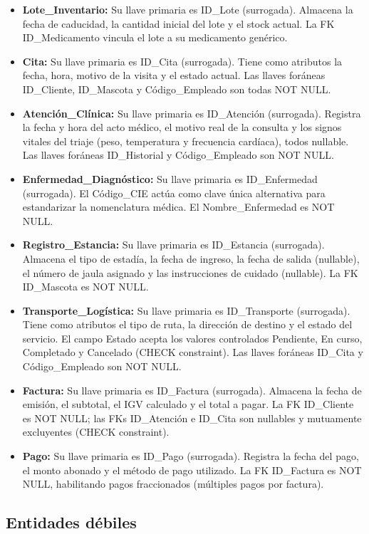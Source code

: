 \begin{itemize}
	\item \textbf{Lote\_Inventario:} Su llave primaria es ID\_Lote (surrogada). Almacena la fecha de caducidad, la cantidad inicial del lote y el stock actual. La FK ID\_Medicamento vincula el lote a su medicamento genérico.
	\item \textbf{Cita:} Su llave primaria es ID\_Cita (surrogada). Tiene como atributos la fecha, hora, motivo de la visita y el estado actual. Las llaves foráneas ID\_Cliente, ID\_Mascota y Código\_Empleado son todas NOT NULL.
	\item \textbf{Atención\_Clínica:} Su llave primaria es ID\_Atención (surrogada). Registra la fecha y hora del acto médico, el motivo real de la consulta y los signos vitales del triaje (peso, temperatura y frecuencia cardíaca), todos nullable. Las llaves foráneas ID\_Historial y Código\_Empleado son NOT NULL.
	\item \textbf{Enfermedad\_Diagnóstico:} Su llave primaria es ID\_Enfermedad (surrogada). El Código\_CIE actúa como clave única alternativa para estandarizar la nomenclatura médica. El Nombre\_Enfermedad es NOT NULL.
	\item \textbf{Registro\_Estancia:} Su llave primaria es ID\_Estancia (surrogada). Almacena el tipo de estadía, la fecha de ingreso, la fecha de salida (nullable), el número de jaula asignado y las instrucciones de cuidado (nullable). La FK ID\_Mascota es NOT NULL.
	\item \textbf{Transporte\_Logística:} Su llave primaria es ID\_Transporte (surrogada). Tiene como atributos el tipo de ruta, la dirección de destino y el estado del servicio. El campo Estado acepta los valores controlados Pendiente, En curso, Completado y Cancelado (CHECK constraint). Las llaves foráneas ID\_Cita y Código\_Empleado son NOT NULL.
	\item \textbf{Factura:} Su llave primaria es ID\_Factura (surrogada). Almacena la fecha de emisión, el subtotal, el IGV calculado y el total a pagar. La FK ID\_Cliente es NOT NULL; las FKs ID\_Atención e ID\_Cita son nullables y mutuamente excluyentes (CHECK constraint).
	\item \textbf{Pago:} Su llave primaria es ID\_Pago (surrogada). Registra la fecha del pago, el monto abonado y el método de pago utilizado. La FK ID\_Factura es NOT NULL, habilitando pagos fraccionados (múltiples pagos por factura).
\end{itemize}

\subsection{Entidades débiles}

